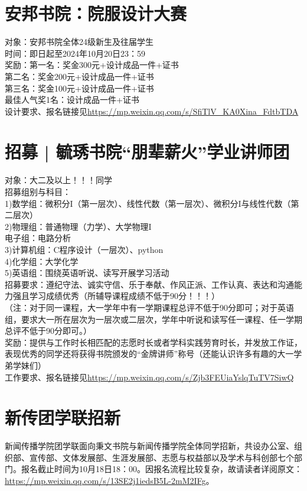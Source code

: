 \documentclass[letterpaper, 12pt]{article}
\begin{document}
\begin{multicols}{2}
\section{安邦书院：院服设计大赛}
对象：安邦书院全体24级新生及往届学生\\
时间：即日起至2024年10月20日23：59\\
奖励：第一名：奖金300元+设计成品一件+证书\\
第二名：奖金200元+设计成品一件+证书\\
第三名：奖金100元+设计成品一件+证书\\
最佳人气奖1名：设计成品一件+证书\\
设计要求、报名链接见\url{https://mp.weixin.qq.com/s/SfiTlV_KA0Xina_FdtbTDA}

\section{招募 | 毓琇书院“朋辈薪火”学业讲师团}
对象：大二及以上！！！同学\\
招募组别与科目：\\
1)数学组：微积分I（第一层次）、线性代数（第一层次）、微积分I与线性代数（第二层次）\\
2)物理组：普通物理（力学）、大学物理I\\
电子组：电路分析\\
3)计算机组：C程序设计（一层次）、python\\
4)化学组：大学化学\\
5)英语组：围绕英语听说、读写开展学习活动\\
招募要求：遵纪守法、诚实守信、乐于奉献、作风正派、工作认真、表达和沟通能力强且学习成绩优秀（所辅导课程成绩不低于90分！！！）\\
（注：对于同一课程，大一学年中有一学期课程总评不低于90分即可；对于英语组，要求大一所在层次为一层次或二层次，学年中听说和读写任一课程、任一学期总评不低于90分即可。）\\
奖励：提供与工作时长相匹配的志愿时长或者学科实践劳育时长，并发放工作证，表现优秀的同学还将获得书院颁发的“金牌讲师”称号（还能认识许多有趣的大一学弟学妹们）\\
工作要求、报名链接见\url{https://mp.weixin.qq.com/s/Zjb3FEUiaYslqTuTV7SiwQ}

\section{新传团学联招新}
新闻传播学院团学联面向秉文书院与新闻传播学院全体同学招新，共设办公室、组织部、宣传部、文体发展部、生涯发展部、志愿与权益部以及学术与科创部七个部门。报名截止时间为10月18日18：00。因报名流程比较复杂，故请读者详阅原文：\url{https://mp.weixin.qq.com/s/13SE2j1iedsB5L-2mM2IFg}。


\end{multicols}
\end{document}
